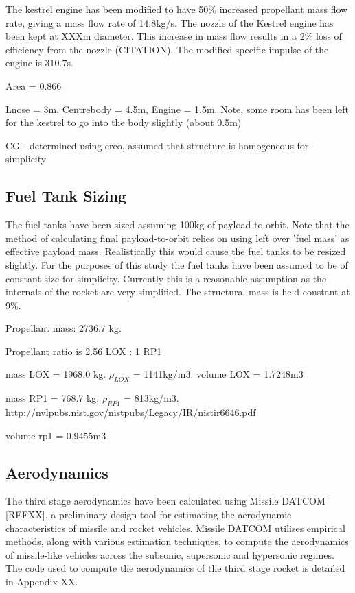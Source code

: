 	

	
The kestrel engine has been modified to have 50\% increased propellant mass flow rate, giving a mass flow rate of 14.8kg/s. The nozzle of the Kestrel engine has been kept at XXXm diameter. This increase in mass flow results in a 2\% loss of efficiency from the nozzle (CITATION). The modified specific impulse of the engine is 310.7s.

	
	Area = 0.866
	
	Lnose = 3m, Centrebody = 4.5m, Engine = 1.5m. Note, some room has been left for the kestrel to go into the body slightly (about 0.5m)
	
	CG - determined using creo, assumed that structure is homogeneous for simplicity
		
		\subsection{Fuel Tank Sizing}
		The fuel tanks have been sized assuming 100kg of payload-to-orbit. Note that the method of calculating final payload-to-orbit relies on using left over 'fuel mass' as effective payload mass. Realistically this would cause the fuel tanks to be resized slightly. For the purposes of this study the fuel tanks have been assumed to be of constant size for simplicity. Currently this is a reasonable assumption as the internals of the rocket are very simplified. The structural mass is held constant at 9\%. 
		

		
		Propellant mass: 2736.7 kg.
		
		Propellant ratio is 2.56 LOX : 1 RP1
		
		mass LOX = 1968.0 kg.
		$\rho_{LOX}$ = 1141kg/m3.
		volume LOX = 1.7248m3
		
		
		mass RP1 = 768.7 kg.
		$\rho_{RP1}$ = 813kg/m3.
		http://nvlpubs.nist.gov/nistpubs/Legacy/IR/nistir6646.pdf
		
		volume rp1 = 0.9455m3
		
		
		
		
		
		
		\subsection{Aerodynamics}
		
		The third stage aerodynamics have been calculated using Missile DATCOM [REFXX], a preliminary design tool for estimating the aerodynamic characteristics of missile and rocket vehicles. Missile DATCOM utilises empirical methods, along with various estimation techniques, to compute the aerodynamics of missile-like vehicles across the subsonic, supersonic and hypersonic regimes.  The code used to compute the aerodynamics of the third stage rocket is detailed in Appendix XX.  
		
